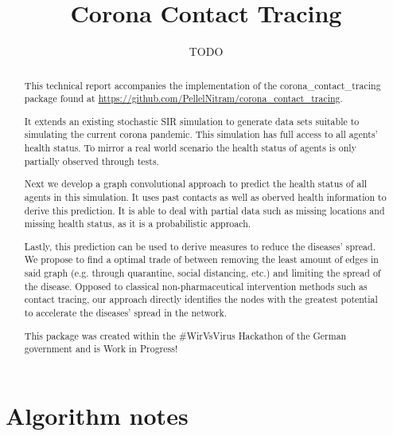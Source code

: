 \documentclass[]{article}
\title{Corona Contact Tracing}
\author{TODO}
\begin{document}
\maketitle

\begin{abstract}
	This technical report accompanies the implementation of the corona\_contact\_tracing package found at \url{https://github.com/PellelNitram/corona_contact_tracing}.

	It extends an existing stochastic SIR simulation to generate data sets suitable to simulating the current corona pandemic.
	This simulation has full access to all agents' health status.
	To mirror a real world scenario the health status of agents is only partially observed through tests.

	Next we develop a graph convolutional approach to predict the health status of all agents in this simulation.
	It uses past contacts as well as oberved health information to derive this prediction.
	It is able to deal with partial data such as missing locations and missing health status, as it is a probabilistic approach.
	
	Lastly, this prediction can be used to derive measures to reduce the diseases' spread.
	We propose to find a optimal trade of between removing the least amount of edges in said graph (e.g. through quarantine, social distancing, etc.) and limiting the spread of the disease.
	Opposed to classical non-pharmaceutical intervention methods such as contact tracing, our approach directly identifies the nodes with the greatest potential to accelerate the diseases' spread in the network.
	
	This package was created within the \#WirVsVirus Hackathon of the German government and is Work in Progress!
\end{abstract}

\section{Algorithm notes}
\end{document}
